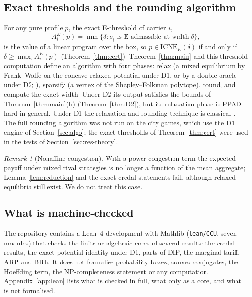 \documentclass[preprint,12pt]{elsarticle}
\theoremstyle{definition}
\theoremstyle{remark}
\newtheorem{remark}[theorem]{Remark}
\newcommand{\ICNE}{\mathrm{ICNE}}
\begin{document}
\subsection{Exact thresholds and the rounding algorithm}\label{sec:cert}

For any pure profile $p$, the exact E-threshold of carrier $i$,\[A^E_i(p)=\min\{\delta: p_i\text{ is E-admissible at width }\delta\},\]is the value of a linear program over the box, so $p\in\ICNE_E(\delta)$ if and only if $\delta\ge\max_iA^E_i(p)$ (Theorem~\ref{thm:cert}). Theorem~\ref{thm:main} and this threshold computation define an algorithm with four phases: relax (a mixed equilibrium by Frank--Wolfe on the concave relaxed potential under D1, or by a double oracle under D2; \citealp{McMahan2003}), sparsify (a vertex of the Shapley--Folkman polytope), round, and compute the exact width. Under D2 its output satisfies the bounds of Theorem~\ref{thm:main}(b) (Theorem~\ref{thm:D2}), but its relaxation phase is PPAD-hard in general. Under D1 the relaxation-and-rounding technique is classical \citep{Aubin1976,Udell2016,Bonnans2023}. The full rounding algorithm was not run on the city games, which use the D1 engine of Section~\ref{sec:algo}; the exact thresholds of Theorem~\ref{thm:cert} were used in the tests of Section~\ref{sec:res-theory}.

\begin{remark}[Nonaffine congestion]\label{rem:nonaffine}
With a power congestion term the expected payoff under mixed rival strategies is no longer a function of the mean aggregate; Lemma~\ref{lem:reduction} and the exact credal statements fail, although relaxed equilibria still exist. We do not treat this case.
\end{remark}

\subsection{What is machine-checked}\label{sec:lean}

The repository contains a Lean~4 development with Mathlib (\texttt{lean/CCU}, seven modules) that checks the finite or algebraic cores of several results: the credal results, the exact potential identity under D1, parts of DIP, the marginal tariff, ARP and BRL. It does not formalise probability boxes, convex conjugates, the Hoeffding term, the NP-completeness statement or any computation. Appendix~\ref{app:lean} lists what is checked in full, what only as a core, and what is not formalised.
\end{document}
